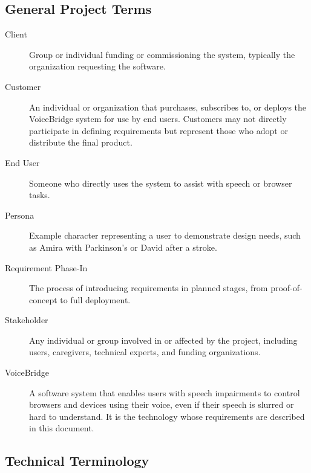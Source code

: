 \documentclass[11pt]{article}
\begin{document}
\subsection*{General Project Terms}

\begin{description}
  \item[Client] Group or individual funding or commissioning the system, typically the organization requesting the software.
  \item[Customer] An individual or organization that purchases, subscribes to, or deploys the VoiceBridge system for use by end users. Customers may not directly participate in defining requirements but represent those who adopt or distribute the final product.
  \item[End User] Someone who directly uses the system to assist with speech or browser tasks.
  \item[Persona] Example character representing a user to demonstrate design needs, such as Amira with Parkinson’s or David after a stroke.
  \item[Requirement Phase-In] The process of introducing requirements in planned stages, from proof-of-concept to full deployment.
  \item[Stakeholder] Any individual or group involved in or affected by the project, including users, caregivers, technical experts, and funding organizations.
  \item[VoiceBridge] A software system that enables users with speech impairments to control browsers and devices using their voice, even if their speech is slurred or hard to understand. It is the technology whose requirements are described in this document.
\end{description}

\subsection*{Technical Terminology}
\end{document}
